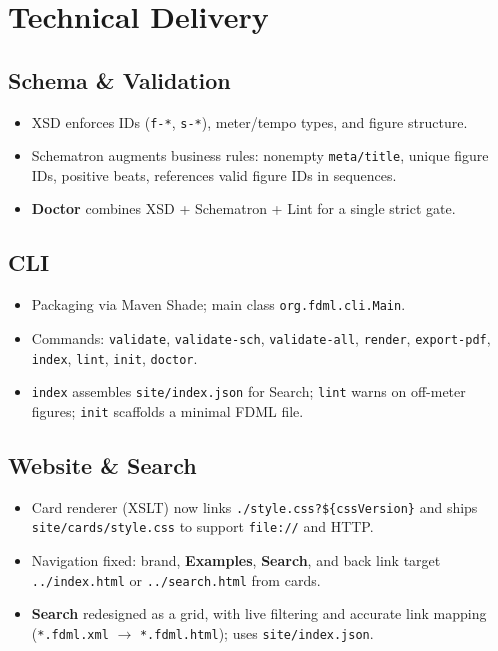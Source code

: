 \documentclass[11pt,a4paper]{article}
\newcommand{\code}[1]{\texttt{#1}}
\begin{document}
\section{Technical Delivery}
\subsection{Schema \& Validation}
\begin{itemize}[leftmargin=1.2em]
  \item XSD enforces IDs (\code{f-*}, \code{s-*}), meter/tempo types, and figure structure.
  \item Schematron augments business rules: nonempty \code{meta/title}, unique figure IDs, positive beats, references valid figure IDs in sequences.
  \item \textbf{Doctor} combines XSD + Schematron + Lint for a single strict gate.
\end{itemize}

\subsection{CLI}
\begin{itemize}[leftmargin=1.2em]
  \item Packaging via Maven Shade; main class \code{org.fdml.cli.Main}.
  \item Commands: \code{validate}, \code{validate-sch}, \code{validate-all}, \code{render}, \code{export-pdf}, \code{index}, \code{lint}, \code{init}, \code{doctor}.
  \item \code{index} assembles \code{site/index.json} for Search; \code{lint} warns on off-meter figures; \code{init} scaffolds a minimal FDML file.
\end{itemize}

\subsection{Website \& Search}
\begin{itemize}[leftmargin=1.2em]
  \item Card renderer (XSLT) now links \code{./style.css?\$\{cssVersion\}} and ships \code{site/cards/style.css} to support \code{file://} and HTTP.
  \item Navigation fixed: brand, \textbf{Examples}, \textbf{Search}, and back link target \code{../index.html} or \code{../search.html} from cards.
  \item \textbf{Search} redesigned as a grid, with live filtering and accurate link mapping (\code{*.fdml.xml} $\rightarrow$ \code{*.fdml.html}); uses \code{site/index.json}.
\end{itemize}
\end{document}
